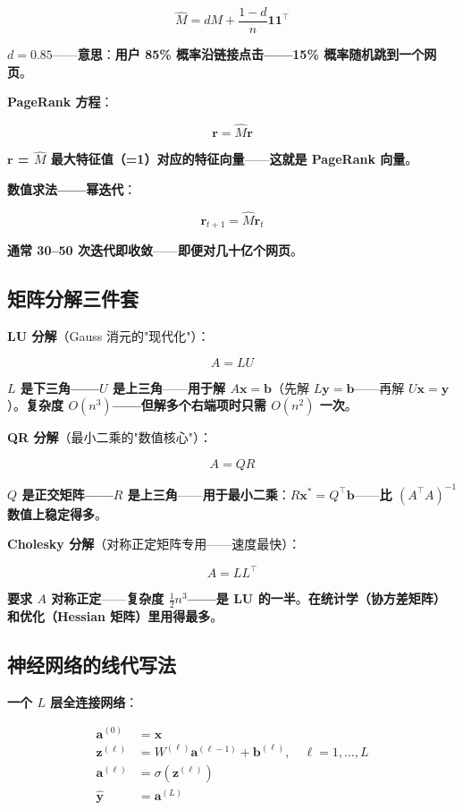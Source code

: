 \[
\hat{M} = d M + \frac{1-d}{n} \bm{1} \bm{1}^{\!\top}
\]

\textbf{$d = 0.85$}——\textbf{意思}：\textbf{用户 85\% 概率沿链接点击——15\% 概率随机跳到一个网页}。

\textbf{PageRank 方程}：

\[
\bm{r} = \hat{M} \bm{r}
\]

\textbf{$\bm{r}$ = $\hat{M}$ 最大特征值（=1）对应的特征向量}——\textbf{这就是 PageRank 向量}。

\textbf{数值求法——幂迭代}：

\[
\bm{r}_{t+1} = \hat{M} \bm{r}_t
\]

\textbf{通常 30--50 次迭代即收敛}——\textbf{即便对几十亿个网页}。

\subsection{矩阵分解三件套}

\textbf{LU 分解}（Gauss 消元的"现代化"）：

\[
A = LU
\]

\textbf{$L$ 是下三角——$U$ 是上三角}——\textbf{用于解 $A \bm{x} = \bm{b}$}（先解 $L \bm{y} = \bm{b}$——再解 $U \bm{x} = \bm{y}$）。\textbf{复杂度 $O(n^3)$——但解多个右端项时只需 $O(n^2)$ 一次}。

\medskip

\textbf{QR 分解}（最小二乘的"数值核心"）：

\[
A = QR
\]

\textbf{$Q$ 是正交矩阵——$R$ 是上三角}——\textbf{用于最小二乘}：\textbf{$R \bm{x}^* = Q^{\!\top} \bm{b}$}——\textbf{比 $(A^{\!\top} A)^{-1}$ 数值上稳定得多}。

\medskip

\textbf{Cholesky 分解}（对称正定矩阵专用——速度最快）：

\[
A = L L^{\!\top}
\]

\textbf{要求 $A$ 对称正定}——\textbf{复杂度 $\frac{1}{2} n^3$——是 LU 的一半}。\textbf{在统计学（协方差矩阵）和优化（Hessian 矩阵）里用得最多}。

\subsection{神经网络的线代写法}

\textbf{一个 $L$ 层全连接网络}：

\[
\begin{aligned}
\bm{a}^{(0)} &= \bm{x} \\
\bm{z}^{(\ell)} &= W^{(\ell)} \bm{a}^{(\ell-1)} + \bm{b}^{(\ell)}, \quad \ell = 1, \dots, L \\
\bm{a}^{(\ell)} &= \sigma(\bm{z}^{(\ell)}) \\
\hat{\bm{y}} &= \bm{a}^{(L)}
\end{aligned}
\]

